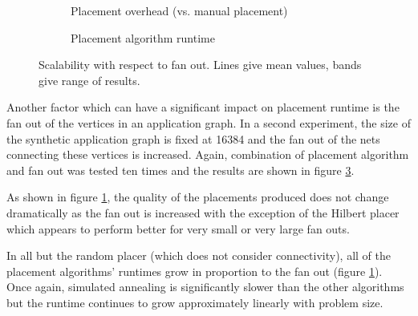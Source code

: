 				\begin{figure}
					\center
					\begin{subfigure}{\linewidth}
						\center
						
						\caption{Placement overhead (vs. manual placement)}
						\label{fig:placement-scalability-fanout-quality}
					\end{subfigure}
					
					\begin{subfigure}{\linewidth}
						\center
						
						\caption{Placement algorithm runtime}
						\label{fig:placement-scalability-fanout-runtime}
					\end{subfigure}
					
						\caption{Scalability with respect to fan out. Lines give mean values,
						bands give range of results.}
					\label{fig:placement-scalability-fanout}
				\end{figure}
				
				Another factor which can have a significant impact on placement runtime
				is the fan out of the vertices in an application graph. In a second
				experiment, the size of the synthetic application graph is fixed at
				\num{16384} and the fan out of the nets connecting these vertices is
				increased. Again, combination of placement algorithm and fan out was
				tested ten times and the results are shown in figure
				\ref{fig:placement-scalability-fanout}.
				
				As shown in figure \ref{fig:placement-scalability-fanout-quality}, the
				quality of the placements produced does not change dramatically as the
				fan out is increased with the exception of the Hilbert placer which
				appears to perform better for very small or very large fan outs.
				
				In all but the random placer (which does not consider connectivity),
				all of the placement algorithms' runtimes grow in proportion to the fan
				out (figure \ref{fig:placement-scalability-fanout-quality}). Once
				again, simulated annealing is significantly slower than the other
				algorithms but the runtime continues to grow approximately linearly
				with problem size.
